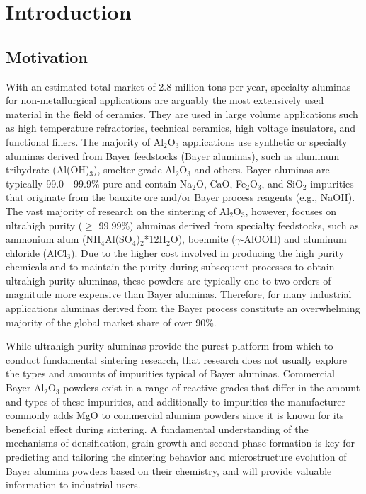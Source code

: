 \chapter{Introduction} \label{chapter1:introduction}

\section{Motivation}
With an estimated total market of 2.8 million tons per year, specialty aluminas for non-metallurgical applications are arguably the most extensively used material in the field of ceramics. They are used in large volume applications such as high temperature refractories, technical ceramics, high voltage insulators, and functional fillers. The majority of Al$_{2}$O$_{3}$ applications use synthetic or specialty aluminas derived from Bayer feedstocks (Bayer aluminas), such as aluminum trihydrate (Al(OH)$_{3}$), smelter grade Al$_{2}$O$_{3}$ and others. Bayer aluminas are typically 99.0 - 99.9\% pure and contain Na$_{2}$O, CaO, Fe$_{2}$O$_{3}$, and SiO$_{2}$ impurities that originate from the bauxite ore and/or Bayer process reagents (e.g., NaOH). The vast majority of research on the sintering of Al$_{2}$O$_{3}$, however, focuses on ultrahigh purity ($\geq$ 99.99\%) aluminas derived from specialty feedstocks, such as ammonium alum (NH$_{4}$Al(SO$_{4}$)$_{2}$*12H$_{2}$O), boehmite ($\gamma$-AlOOH) and aluminum chloride (AlCl$_{3}$). Due to the higher cost involved in producing the high purity chemicals and to maintain the purity during subsequent processes to obtain ultrahigh-purity aluminas, these powders are typically one to two orders of magnitude more expensive than Bayer aluminas. Therefore, for many industrial applications aluminas derived from the Bayer process constitute an overwhelming majority of the global market share of over 90\%.

While ultrahigh purity aluminas provide the purest platform from which to conduct fundamental sintering research, that research does not usually explore the types and amounts of impurities typical of Bayer aluminas. Commercial Bayer Al$_{2}$O$_{3}$ powders exist in a range of reactive grades that differ in the amount and types of these impurities, and additionally to impurities the manufacturer commonly adds MgO to commercial alumina powders since it is known for its beneficial effect during sintering. A fundamental understanding of the mechanisms of densification, grain growth and second phase formation is key for predicting and tailoring the sintering behavior and microstructure evolution of Bayer alumina powders based on their chemistry, and will provide valuable information to industrial users.

